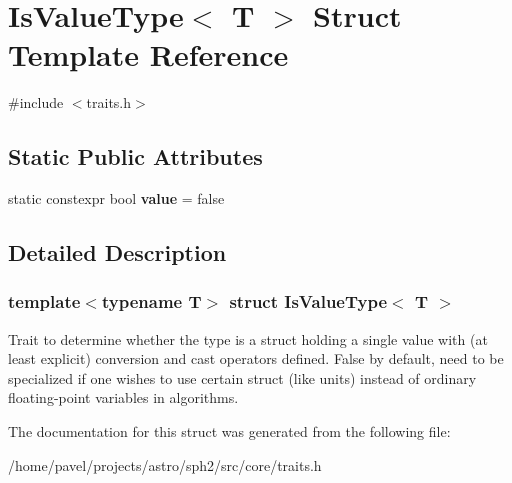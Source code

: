 \hypertarget{structIsValueType}{}\section{Is\+Value\+Type$<$ T $>$ Struct Template Reference}
\label{structIsValueType}


{\ttfamily \#include $<$traits.\+h$>$}

\subsection*{Static Public Attributes}
\begin{DoxyCompactItemize}
\item 
\hypertarget{structIsValueType_ab5f586eb43a336b367e924fda58a935a}{}\label{structIsValueType_ab5f586eb43a336b367e924fda58a935a} 
static constexpr bool {\bfseries value} = false
\end{DoxyCompactItemize}


\subsection{Detailed Description}
\subsubsection*{template$<$typename T$>$\newline
struct Is\+Value\+Type$<$ T $>$}

Trait to determine whether the type is a struct holding a single value with (at least explicit) conversion and cast operators defined. False by default, need to be specialized if one wishes to use certain struct (like units) instead of ordinary floating-\/point variables in algorithms. 

The documentation for this struct was generated from the following file\+:\begin{DoxyCompactItemize}
\item 
/home/pavel/projects/astro/sph2/src/core/traits.\+h\end{DoxyCompactItemize}
